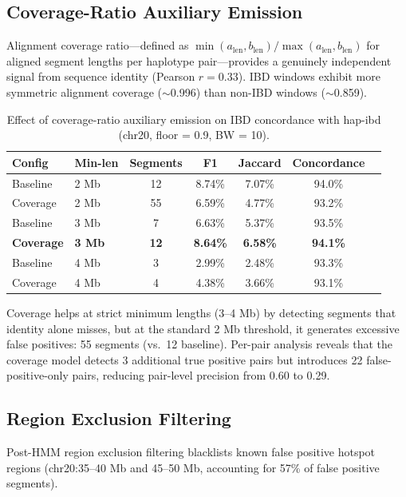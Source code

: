 \documentclass[11pt]{article}
\begin{document}
\subsection{Coverage-Ratio Auxiliary Emission}
\label{sec:supp_coverage_ratio}

Alignment coverage ratio---defined as $\min(a_{\text{len}}, b_{\text{len}}) / \max(a_{\text{len}}, b_{\text{len}})$ for aligned segment lengths per haplotype pair---provides a genuinely independent signal from sequence identity (Pearson $r = 0.33$). IBD windows exhibit more symmetric alignment coverage ($\sim$0.996) than non-IBD windows ($\sim$0.859).

\begin{table}[ht]
\centering
\caption{Effect of coverage-ratio auxiliary emission on IBD concordance with hap-ibd (chr20, floor = 0.9, BW = 10).}
\label{tab:coverage_ratio}
\begin{tabular}{llccccc}
\hline
\textbf{Config} & \textbf{Min-len} & \textbf{Segments} & \textbf{F1} & \textbf{Jaccard} & \textbf{Concordance} \\
\hline
Baseline & 2 Mb & 12 & 8.74\% & 7.07\% & 94.0\% \\
Coverage & 2 Mb & 55 & 6.59\% & 4.77\% & 93.2\% \\
Baseline & 3 Mb & 7 & 6.63\% & 5.37\% & 93.5\% \\
\textbf{Coverage} & \textbf{3 Mb} & \textbf{12} & \textbf{8.64\%} & \textbf{6.58\%} & \textbf{94.1\%} \\
Baseline & 4 Mb & 3 & 2.99\% & 2.48\% & 93.3\% \\
Coverage & 4 Mb & 4 & 4.38\% & 3.66\% & 93.1\% \\
\hline
\end{tabular}
\end{table}

Coverage helps at strict minimum lengths (3--4 Mb) by detecting segments that identity alone misses, but at the standard 2 Mb threshold, it generates excessive false positives: 55 segments (vs.\ 12 baseline). Per-pair analysis reveals that the coverage model detects 3 additional true positive pairs but introduces 22 false-positive-only pairs, reducing pair-level precision from 0.60 to 0.29.

\subsection{Region Exclusion Filtering}
\label{sec:supp_region_exclusion}

Post-HMM region exclusion filtering blacklists known false positive hotspot regions (chr20:35--40 Mb and 45--50 Mb, accounting for 57\% of false positive segments).
\end{document}
